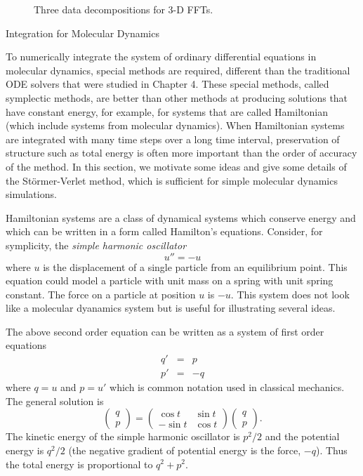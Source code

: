 \begin{figure}[htbp]
\begin{center}
\caption{Three data decompositions for 3-D FFTs.}
\label{fig:fft3}
\end{center}
\end{figure}

 {Integration for Molecular Dynamics}

To numerically integrate the system of ordinary differential
equations in molecular dynamics, special methods are required,
different than the traditional ODE solvers that were studied in
Chapter 4.  These special methods, called symplectic methods,
are better than other methods at producing solutions that have
constant energy, for example, for systems that are called
Hamiltonian (which include systems from molecular dynamics).  
When Hamiltonian systems are integrated with many time steps
over a long time interval, preservation of structure such as
total energy is often more important than the order of accuracy
of the method.  In this section, we motivate some ideas and
give some details of the St\"{o}rmer-Verlet method, which is sufficient
for simple molecular dynamics simulations.

Hamiltonian systems are a class of dynamical systems
which conserve energy and which can be written in a form
called Hamilton's equations.  Consider, for symplicity, the {\em simple
harmonic oscillator}
\[
u'' = -u
\]
where $u$ is the displacement of a single particle from an equilibrium
point.  This equation could model a particle with unit mass on a spring
with unit spring constant.  The force on a particle at position $u$ is
$-u$.
This system does not look like a molecular dyanamics system but
is useful for illustrating several ideas.

The above second order equation can be written
as a system of first order equations
\begin{eqnarray*}
q' &=& p \\
p' &=& -q 
\end{eqnarray*}
where $q = u$ and $p=u'$ which is common notation used
in classical mechanics.  The general solution is
\[
\left( \begin{array}{c} q \\ p \end{array} \right)
=
\left( \begin{array}{rr}  \cos t & \sin t \\
                         -\sin t & \cos t \end{array} \right)
\left( \begin{array}{c} q \\ p \end{array} \right) .
\]
The kinetic energy of the simple harmonic oscillator is
$p^2/2$ and the potential energy is $q^2/2$ (the negative 
gradient of potential energy is the force, $-q$).
Thus the total energy is proportional to
$q^2 + p^2$.

